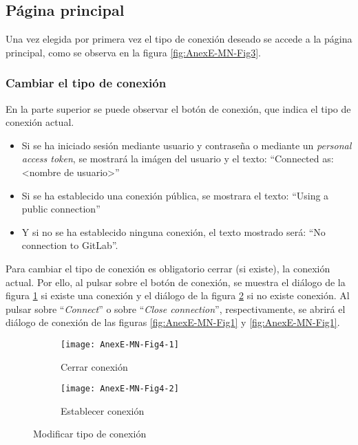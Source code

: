 \newpage
\subsection{Página principal}


Una vez elegida por primera vez el tipo de conexión deseado se accede a la página principal, como se observa en la figura \ref{fig:AnexE-MN-Fig3}.

\subsubsection{Cambiar el tipo de conexión}

En la parte superior se puede observar el botón de conexión, que indica el tipo de conexión actual.
\begin{itemize}
	\tightlist
	\item Si se ha iniciado sesión mediante usuario y contraseña o mediante un \textit{personal access token}, se mostrará la imágen del usuario y el texto: ``Connected as: <nombre de usuario>''
	\item Si se ha establecido una conexión pública, se mostrara el texto: ``Using a public connection''
	\item Y si no se ha establecido ninguna conexión, el texto mostrado será: ``No connection to GitLab''.
\end{itemize}
Para cambiar el tipo de conexión es obligatorio cerrar (si existe), la conexión actual. Por ello, al pulsar sobre el botón de conexión, se muestra el diálogo de la figura \ref{fig:AnexE-MN-Fig4-1} si existe una conexión y el diálogo de la figura \ref{fig:AnexE-MN-Fig4-2} si no existe conexión. Al pulsar sobre ``\textit{Connect}'' o sobre ``\textit{Close connection}'', respectivamente, se abrirá el diálogo de conexión de las figuras \ref{fig:AnexE-MN-Fig1} y \ref{fig:AnexE-MN-Fig1}.
\begin{figure}[!h]
	\centering
	\begin{subfigure}{.45\textwidth}
		\centering
		\texttt{[image: AnexE-MN-Fig4-1]}
		\caption{Cerrar conexión}
		\label{fig:AnexE-MN-Fig4-1}
	\end{subfigure}\hfill
	\begin{subfigure}{.45\textwidth}
		\centering
		\texttt{[image: AnexE-MN-Fig4-2]}
		\caption{Establecer conexión}
		\label{fig:AnexE-MN-Fig4-2}
	\end{subfigure}
	\caption{Modificar tipo de conexión}
	\label{fig:AnexE-MN-Fig4}
\end{figure}
